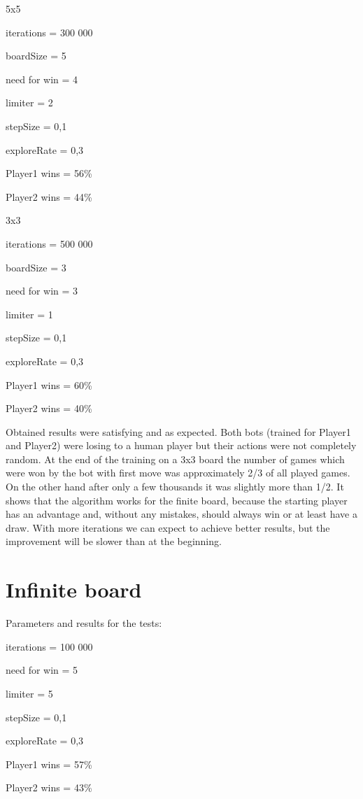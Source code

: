 \documentclass[a4paper,12pt]{book}
\begin{document}
\begin{description}
	\item 5x5
	\item iterations = 300 000
	\item boardSize = 5
	\item need for win = 4
	\item limiter = 2
	\item stepSize = 0,1
	\item exploreRate = 0,3
	\item Player1 wins = 56\%
	\item Player2 wins = 44\%
	\newline
	\item 3x3
	\item iterations = 500 000
	\item boardSize = 3
	\item need for win = 3
	\item limiter = 1
	\item stepSize = 0,1
	\item exploreRate = 0,3
	\item Player1 wins = 60\%
	\item Player2 wins = 40\%
\end{description}

Obtained results were satisfying and as expected. Both bots (trained for Player1 and Player2) were losing to a human player but their actions were not completely random. At the end of the training on a 3x3 board the number of games which were won by the bot with first move was approximately 2/3 of all played games. On the other hand after only a few thousands it was slightly more than 1/2. It shows that the algorithm works for the finite board, because the starting player has an advantage and, without any mistakes, should always win or at least have a draw. With more iterations we can expect to achieve better results, but the improvement will be slower than at the beginning.

 	\section{Infinite board}

Parameters and results for the tests:

\begin{description}
	\item iterations = 100 000
	\item need for win = 5
	\item limiter = 5
	\item stepSize = 0,1
	\item exploreRate = 0,3
	\item Player1 wins = 57\%
	\item Player2 wins = 43\%
\end{description}
\end{document}
